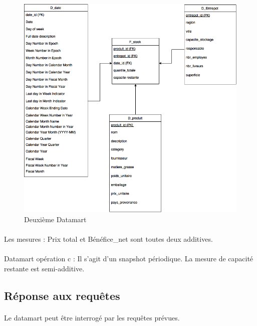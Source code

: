     \begin{figure}[h]
        \centerline{\includegraphics[scale=0.6]{EtoileDM2.png}}
        \caption{Deuxième Datamart}
        \label{fig:UML}
    \end{figure}

\paragraph{} Les mesures : Prix total et Bénéfice\_net sont toutes deux additives.

\paragraph{} 
\paragraph{} Datamart opération c :
Il s’agit d’un snapshot périodique.
La mesure de capacité restante est semi-additive.

\subsection{Réponse aux requêtes} 
\paragraph{} Le datamart peut être interrogé par les requêtes prévues.

